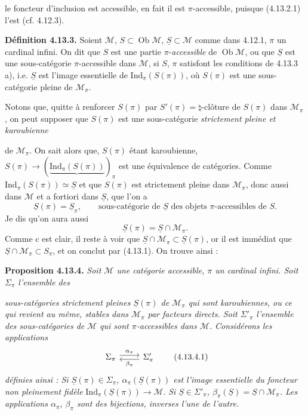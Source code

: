 \documentclass[11pt]{article}
\newcommand{\printedpage}[1]{\marginpar{\footnotesize p.~#1}}
\newcommand{\msp}[1]{\marginpar{\footnotesize [#1]}}
\newcommand{\Ind}{\mathrm{Ind}}
\newcommand{\Ob}{\operatorname{Ob}}
\newcommand{\M}{\mathcal{M}}
\newcommand{\uS}{\underline{S}}
\begin{document}
\msp{page 286}
 le foncteur d'inclusion est accessible, en fait il est $\pi$-accessible, puisque (4.13.2.1) l'est (cf. 4.12.3).

\textbf{Définition 4.13.3.} Soient $\M$, $S \subset \Ob\M$, $\uS \subset \M$ comme dans 4.12.1, $\pi$ un cardinal infini. On dit que $S$ est une partie $\pi$-\textit{accessible} de $\Ob\M$, ou que $\uS$ est une sous-catégorie $\pi$-accessible dans $\M$, si $S$, $\pi$ satisfont les conditions de 4.13.3 a), i.e. $\uS$ est l'image essentielle %
de $\Ind_\pi(S(\pi))$, où $S(\pi)$ est une sous-catégorie pleine de $\M_\pi$.

Notons que, quitte à renforcer $S(\pi)$ par $S'(\pi) = {\natural}$-clôture de $S(\pi)$ dans $\M_\pi$, on peut supposer que $S(\pi)$ est une sous-catégorie \textit{strictement pleine et karoubienne}

\msp{page 287}
de $\M_\pi$. On sait alors que, $S(\pi)$ étant karoubienne, $S(\pi) \longrightarrow (\underbrace{\Ind_\pi(S(\pi))}_{})_\pi$ est une équivalence de catégories. Comme $\Ind_\pi(S(\pi)) \simeq \uS$ et que $S(\pi)$ est strictement pleine dans $\M_\pi$, donc aussi dans $\M$ et a fortiori dans $\uS$, que l'on a
\[
\uS(\pi) = \uS_\pi , \qquad \text{sous-catégorie de } \uS \text{ des objets } \pi\text{-accessibles de } S. \tag*{(4.13.1)}
\]
Je dis qu'on aura aussi
\[
\uS(\pi) = \uS \cap \M_\pi . \tag*{(4.13.2)}
\]
Comme c est clair, il reste à voir que $\uS{\cap}\M_\pi \subset \uS(\pi)$, or il est immédiat que $\uS{\cap}\M_\pi \subset S_\pi$, %
et on conclut par (4.13.1). On trouve ainsi :

\textbf{Proposition 4.13.4.} \textit{Soit $\M$ une catégorie accessible, $\pi$ un cardinal infini. Soit $\Sigma_\pi$ l'ensemble des}

\msp{page 288}
\textit{sous-catégories strictement pleines $\uS(\pi)$ de $\M_\pi$ qui sont karoubiennes, ou ce qui revient au même, stables dans $\M_\pi$ par facteurs directs. Soit $\Sigma'_\pi$ l'ensemble des sous-catégories de}
\printedpage{107}
\textit{$\M$ qui sont $\pi$-accessibles dans $\M$. Considérons les applications}
\[
\begin{tikzcd}
\Sigma_\pi \arrow[r, shift left, "\alpha_\pi"] & \Sigma'_\pi \arrow[l, shift left, "\beta_\pi"]
\end{tikzcd}
\tag*{(4.13.4.1)}
\]
\textit{définies ainsi : Si $\uS(\pi) \in \Sigma_\pi$, $\alpha_\pi(\uS(\pi))$ est l'image essentielle du foncteur non pleinement fidèle} $\Ind_\pi(\uS(\pi)) \longrightarrow \M$. \textit{Si $\uS \in \Sigma'_\pi$, $\beta_\pi(\uS) = \uS \cap \M_\pi$. Les applications $\alpha_\pi$, $\beta_\pi$ sont des bijections, inverses l'une de l'autre.}
\end{document}
